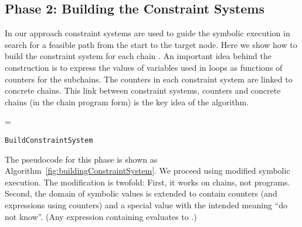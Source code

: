 \documentclass{llncs}
\begin{document}
\subsection{Phase 2: Building the Constraint Systems}
\label{sec:AlgConstraints}

In our approach constraint systems are used to guide the symbolic execution in search for a
feasible path from the start to the target node.  Here we show how to build
the constraint system  for each chain . An important idea
behind the construction is to express the values of variables used in loops
as functions of counters for the subchains. The counters in each
constraint system are linked to concrete chains. This link between
constraint systems, counters and concrete chains (in the chain program form)
is the key idea of the algorithm.

\begin{algorithm}
\dontprintsemicolon
{}
  = \;
  \;
  \;
  \BlankLine 
 \caption{\texttt{BuildConstraintSystem}}
  \label{fig:buildingConstraintSystem}  
\end{algorithm}

The pseudocode for this phase is shown as
Algorithm~\ref{fig:buildingConstraintSystem}. We proceed using modified
symbolic execution. The modification is twofold: First, it works on
chains, not programs. Second, the domain of symbolic values is extended to contain
counters (and expressions using counters) and a special value  with
the intended meaning ``do not know''. (Any expression containing 
evaluates to .)
\end{document}
